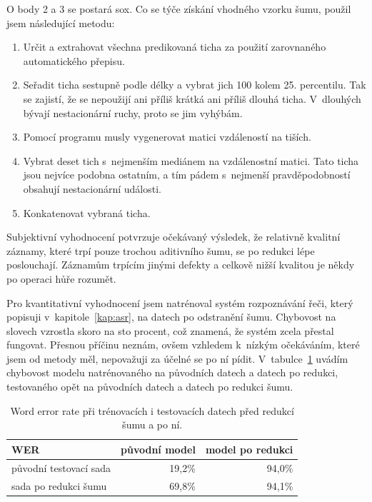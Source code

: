 O body 2 a 3 se postará sox. Co se týče získání vhodného vzorku šumu, použil jsem
následující metodu:
\begin{enumerate}
\item{
    Určit a extrahovat všechna predikovaná ticha za použití zarovnaného
    automatického přepisu.
}
\item{
    Seřadit ticha sestupně podle délky a vybrat jich 100 kolem 25. percentilu.
    Tak se zajistí, že se nepoužijí ani příliš krátká ani příliš dlouhá ticha.
    V~dlouhých bývají nestacionární ruchy, proto se jim vyhýbám.
}
\item{
    Pomocí programu musly vygenerovat matici vzdáleností na tiších.
}
\item{
    Vybrat deset tich s~nejmenším mediánem na vzdálenostní matici. Tato ticha
    jsou nejvíce podobna ostatním, a tím pádem s~nejmenší pravděpodobností
    obsahují nestacionární události.
}
\item{
    Konkatenovat vybraná ticha.
}
\end{enumerate}

Subjektivní vyhodnocení potvrzuje očekávaný výsledek, že relativně kvalitní
záznamy, které trpí pouze trochou aditivního šumu, se po redukci lépe
poslouchají. Záznamům trpícím jinými defekty a celkově nižší kvalitou je někdy po
operaci hůře rozumět.

Pro kvantitativní vyhodnocení jsem natrénoval systém rozpoznávání řeči, který
popisuji v~kapitole~\ref{kap:asr}, na datech po odstranění šumu. Chybovost na
slovech vzrostla skoro na sto procent, což znamená, že systém zcela přestal
fungovat. Přesnou příčinu neznám, ovšem vzhledem k~nízkým očekáváním, které jsem
od metody měl, nepovažuji za účelné se po ní pídit.
V~tabulce~\ref{tab:results-denoise} uvádím chybovost modelu natrénovaného na
původních datech a datech po redukci, testovaného opět na původních datech a
datech po redukci šumu.

\begin{table}[htpb]
\begin{center}
\begin{tabular}{|l||r|r|}
\hline
WER    & původní model & model po redukci \\
\hline
původní testovací sada & 19,2\% & 94,0\% \\
sada po redukci šumu   & 69,8\% & 94,1\% \\
\hline
\end{tabular}
\caption{Word error rate při trénovacích i testovacích datech před redukcí šumu
a po ní.}\label{tab:results-denoise}
\end{center}
\end{table}

